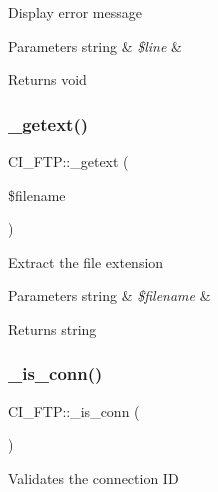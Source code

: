 Display error message


\begin{DoxyParams}[1]{Parameters}
string & {\em \$line} & \\
\hline
\end{DoxyParams}
\begin{DoxyReturn}{Returns}
void 
\end{DoxyReturn}
\mbox{\label{class_c_i___f_t_p_aff9447150095a05eedd03153a6ae3ce6}} 
\subsubsection{\texorpdfstring{\+\_\+getext()}{\_getext()}}
{\footnotesize\ttfamily C\+I\+\_\+\+F\+T\+P\+::\+\_\+getext (\begin{DoxyParamCaption}\item[{}]{\$filename }\end{DoxyParamCaption})\hspace{0.3cm}{\ttfamily [protected]}}

Extract the file extension


\begin{DoxyParams}[1]{Parameters}
string & {\em \$filename} & \\
\hline
\end{DoxyParams}
\begin{DoxyReturn}{Returns}
string 
\end{DoxyReturn}
\mbox{\label{class_c_i___f_t_p_a6f5208a2267e9b32bd478281c131d1d6}} 
\subsubsection{\texorpdfstring{\+\_\+is\+\_\+conn()}{\_is\_conn()}}
{\footnotesize\ttfamily C\+I\+\_\+\+F\+T\+P\+::\+\_\+is\+\_\+conn (\begin{DoxyParamCaption}{ }\end{DoxyParamCaption})\hspace{0.3cm}{\ttfamily [protected]}}

Validates the connection ID

